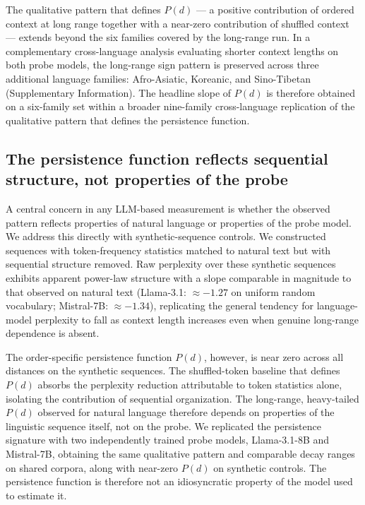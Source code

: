 \documentclass[11pt]{article}
\begin{document}
The qualitative pattern that defines $P(d)$ --- a positive contribution of ordered
context at long range together with a near-zero contribution of shuffled context ---
extends beyond the six families covered by the long-range run. In a complementary
cross-language analysis evaluating shorter context lengths on both probe models, the
long-range sign pattern is preserved across three additional language families:
Afro-Asiatic, Koreanic, and Sino-Tibetan (Supplementary Information). The headline
slope of $P(d)$ is therefore obtained on a six-family set within a broader nine-family
cross-language replication of the qualitative pattern that defines the persistence
function.

\subsection{The persistence function reflects sequential structure, not properties of the probe}

A central concern in any LLM-based measurement is whether the observed pattern
reflects properties of natural language or properties of the probe model. We address
this directly with synthetic-sequence controls. We constructed sequences with
token-frequency statistics matched to natural text but with sequential structure
removed. Raw perplexity over these synthetic sequences exhibits apparent power-law
structure with a slope comparable in magnitude to that observed on natural text
(Llama-3.1: $\approx -1.27$ on uniform random vocabulary; Mistral-7B: $\approx -1.34$),
replicating the general tendency for language-model perplexity to fall as context
length increases even when genuine long-range dependence is absent.

The order-specific persistence function $P(d)$, however, is near zero across all
distances on the synthetic sequences. The shuffled-token baseline that defines $P(d)$
absorbs the perplexity reduction attributable to token statistics alone, isolating the
contribution of sequential organization. The long-range, heavy-tailed $P(d)$ observed
for natural language therefore depends on properties of the linguistic sequence
itself, not on the probe. We replicated the persistence signature with two
independently trained probe models, Llama-3.1-8B and Mistral-7B, obtaining the same
qualitative pattern and comparable decay ranges on shared corpora, along with near-zero
$P(d)$ on synthetic controls. The persistence function is therefore not an idiosyncratic
property of the model used to estimate it.
\end{document}
